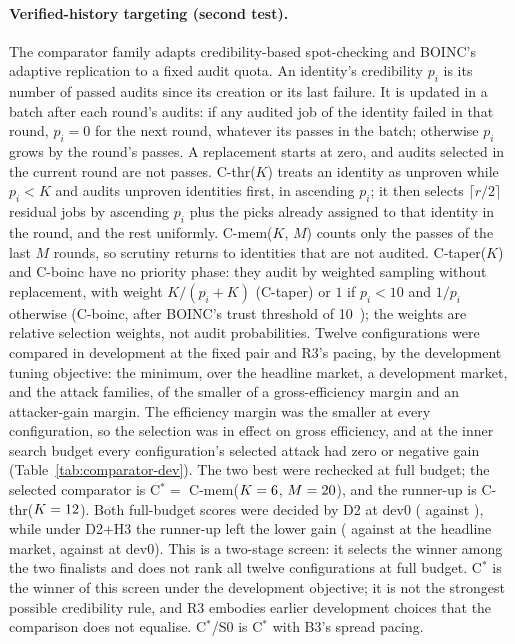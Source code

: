 \documentclass[11pt]{article}
\begin{document}
\paragraph{Verified-history targeting (second test).} The comparator family adapts credibility-based spot-checking and BOINC's adaptive replication to a fixed audit quota. An identity's credibility $p_i$ is its number of passed audits since its creation or its last failure. It is updated in a batch after each round's audits: if any audited job of the identity failed in that round, $p_i = 0$ for the next round, whatever its passes in the batch; otherwise $p_i$ grows by the round's passes. A replacement starts at zero, and audits selected in the current round are not passes. C-thr($K$) treats an identity as unproven while $p_i < K$ and audits unproven identities first, in ascending $p_i$; it then selects $\lceil r/2 \rceil$ residual jobs by ascending $p_i$ plus the picks already assigned to that identity in the round, and the rest uniformly. C-mem($K$, $M$) counts only the passes of the last $M$ rounds, so scrutiny returns to identities that are not audited. C-taper($K$) and C-boinc have no priority phase: they audit by weighted sampling without replacement, with weight $K/(p_i + K)$ (C-taper) or $1$ if $p_i < 10$ and $1/p_i$ otherwise (C-boinc, after BOINC's trust threshold of 10~\cite{boincwiki}); the weights are relative selection weights, not audit probabilities. Twelve configurations were compared in development at the fixed pair and R3's pacing, by the development tuning objective: the minimum, over the headline market, a development market, and the attack families, of the smaller of a gross-efficiency margin and an attacker-gain margin. The efficiency margin was the smaller at every configuration, so the selection was in effect on gross efficiency, and at the inner search budget every configuration's selected attack had zero or negative gain (Table~\ref{tab:comparator-dev}). The two best were rechecked at full budget; the selected comparator is C$^* = $ C-mem($K = 6$, $M = 20$), and the runner-up is C-thr($K = 12$). Both full-budget scores were decided by D2 at dev0 ( against ), while under D2+H3 the runner-up left the lower gain ( against  at the headline market,  against  at dev0). This is a two-stage screen: it selects the winner among the two finalists and does not rank all twelve configurations at full budget. C$^*$ is the winner of this screen under the development objective; it is not the strongest possible credibility rule, and R3 embodies earlier development choices that the comparison does not equalise. C$^*$/S0 is C$^*$ with B3's spread pacing.
\end{document}

